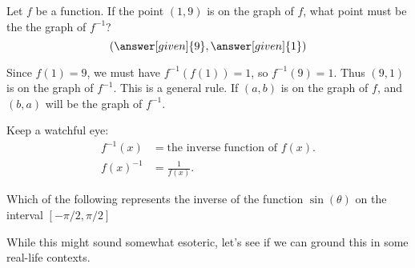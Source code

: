 \documentclass{ximera}
\begin{document}
\begin{question}
  Let $f$ be a function.  If the point $(1,9)$ is on the graph of $f$,
  what point must be the the graph of $f^{-1}$?	
  \[
  \left( \answer[given]{9}, \answer[given]{1} \right)
  \]
  \begin{feedback}
    Since $f(1) = 9$, we must have $f^{-1}(f(1)) = 1$, so $f^{-1}(9) =
    1$.  Thus $(9,1)$ is on the graph of $f^{-1}$.  This is a general
    rule.  If $(a,b)$ is on the graph of $f$, and $(b,a)$ will be the
    graph of $f^{-1}$.
  \end{feedback}
\end{question}

\begin{warning}
  Keep a watchful eye:
  \begin{align*}
    f^{-1}(x) &= \text{the inverse function of $f(x)$.}\\
    f(x)^{-1} &= \text{$\frac{1}{f(x)}$.}
  \end{align*}
\end{warning}
\begin{question}
  Which of the following represents the inverse of the function
  $\sin(\theta)$ on the interval $[-\pi/2,\pi/2]$
  \begin{multipleChoice}
  \end{multipleChoice}
\end{question}


While this might sound somewhat esoteric, let's see
if we can ground this in some real-life contexts.
\end{document}
